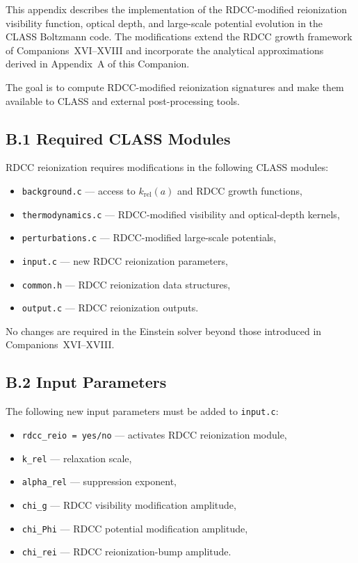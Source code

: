 \documentclass[11pt,a4paper]{article}
\begin{document}
This appendix describes the implementation of the RDCC-modified reionization visibility
function, optical depth, and large-scale potential evolution in the CLASS Boltzmann code. The
modifications extend the RDCC growth framework of Companions~XVI–XVIII and incorporate
the analytical approximations derived in Appendix~A of this Companion.

The goal is to compute RDCC-modified reionization signatures and make them available to
CLASS and external post-processing tools.

\subsection*{B.1 Required CLASS Modules}

RDCC reionization requires modifications in the following CLASS modules:

\begin{itemize}
\item \texttt{background.c} — access to $k_{\mathrm{rel}}(a)$ and RDCC growth functions,
\item \texttt{thermodynamics.c} — RDCC-modified visibility and optical-depth kernels,
\item \texttt{perturbations.c} — RDCC-modified large-scale potentials,
\item \texttt{input.c} — new RDCC reionization parameters,
\item \texttt{common.h} — RDCC reionization data structures,
\item \texttt{output.c} — RDCC reionization outputs.
\end{itemize}

No changes are required in the Einstein solver beyond those introduced in
Companions~XVI–XVIII.

\subsection*{B.2 Input Parameters}

The following new input parameters must be added to \texttt{input.c}:

\begin{itemize}
\item \texttt{rdcc\_reio = yes/no} — activates RDCC reionization module,
\item \texttt{k\_rel} — relaxation scale,
\item \texttt{alpha\_rel} — suppression exponent,
\item \texttt{chi\_g} — RDCC visibility modification amplitude,
\item \texttt{chi\_Phi} — RDCC potential modification amplitude,
\item \texttt{chi\_rei} — RDCC reionization-bump amplitude.
\end{itemize}
\end{document}
